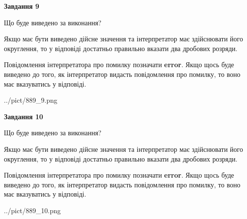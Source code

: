\documentclass[12pt, ukrainian]{article}
\begin{document}
{\begin {Large}
{\begin {center}\textbf{Завдання 9}\end {center}}\par
Що буде виведено за виконання? \par

Якщо має бути виведено дійсне значення та інтерпретатор має здійснювати його округлення, 
то у відповіді достатньо правильно вказати два дробових розряди.

Повідомлення інтерпретатора про помилку позначати \textbf{error}.
Якщо щось буде виведено до того, як інтерпретатор видасть повідомлення про помилку, 
то воно має вказуватись у відповіді. \par

\begin{center}
	{../pict/889_9.png}
\end{center}
\newpage

{\begin {center}\textbf{Завдання 10}\end {center}}\par
Що буде виведено за виконання? \par

Якщо має бути виведено дійсне значення та інтерпретатор має здійснювати його округлення, 
то у відповіді достатньо правильно вказати два дробових розряди.

Повідомлення інтерпретатора про помилку позначати \textbf{error}.
Якщо щось буде виведено до того, як інтерпретатор видасть повідомлення про помилку, 
то воно має вказуватись у відповіді. \par

\begin{center}
	{../pict/889_10.png}
\end{center}
\newpage

\end {Large}}
\end{document}

